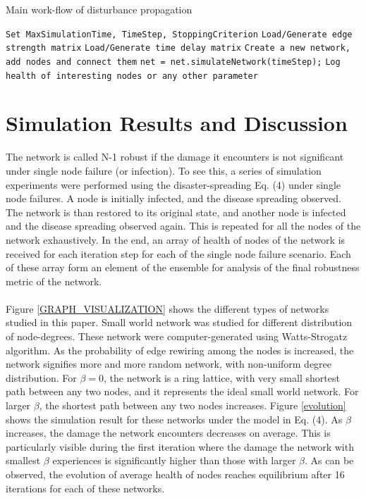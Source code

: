 \documentclass[11pt]{article}
\begin{document}
\begin{algorithm}
\caption{Main work-flow of disturbance propagation}\label{MAIN_PSEUDO_CODE}
\begin{algorithmic}[1]
			\State \texttt{Set MaxSimulationTime, TimeStep, StoppingCriterion}
			\State \texttt{Load/Generate edge strength matrix}
			\State \texttt{Load/Generate time delay matrix}
			\State \texttt{Create a new network, add nodes and connect them}
	\EndProcedure
			\State \texttt{net = net.simulateNetwork(timeStep);}
			\State \texttt{Log health of interesting nodes or any other parameter}
		\EndWhile
	\EndProcedure
\EndProcedure
\end{algorithmic}
\end{algorithm}

\newpage
\section{Simulation Results and Discussion}
The network is called N-1 robust if the damage it encounters is not significant under single node failure (or infection).  To see this, a series of simulation experiments were performed using the disaster-spreading Eq. (4) under single node failures. A node is initially infected, and the disease spreading observed. The network is than restored to its original state, and another node is infected and the disease spreading observed again. This is repeated for all the nodes of the network exhaustively. In the end, an array of health of nodes of the network is received for each iteration step for each of the single node failure scenario. Each of these array form an element of the ensemble for analysis of the final robustness metric of the network. \\
\\
Figure \ref{GRAPH_VISUALIZATION} shows the different types of networks studied in this paper. Small world network was studied for different distribution of node-degrees. These network were computer-generated using Watts-Strogatz algorithm. As the probability of edge rewiring among the nodes is increased, the network signifies more and more random network, with non-uniform degree distribution. For $\beta=0$, the network is a ring lattice, with very small shortest path between any two nodes, and it represents the ideal small world network. For larger $\beta$, the shortest path between any two nodes increases. Figure \ref{evolution} shows the simulation result for these networks under the model in Eq. (4). As $\beta$ increases, the damage the network encounters decreases on average. This is particularly visible during the first iteration where the damage the network with smallest $\beta$ experiences is significantly higher than those with larger $\beta$. As can be observed, the evolution of average health of nodes reaches equilibrium after 16 iterations for each of these networks. 
\end{document}
